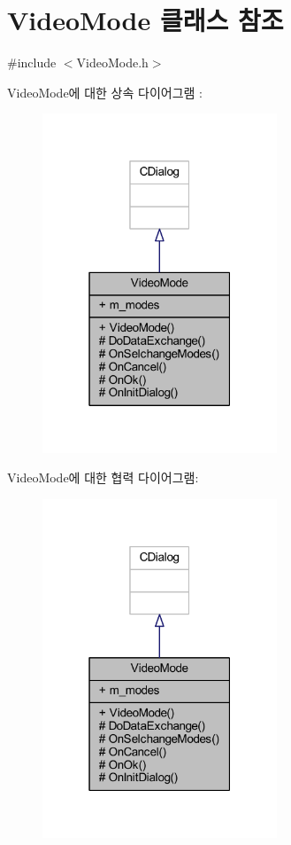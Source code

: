 \hypertarget{class_video_mode}{}\section{Video\+Mode 클래스 참조}
\label{class_video_mode}


{\ttfamily \#include $<$Video\+Mode.\+h$>$}



Video\+Mode에 대한 상속 다이어그램 \+: \nopagebreak
\begin{figure}[H]
\begin{center}
\leavevmode
\includegraphics[width=199pt]{class_video_mode__inherit__graph}
\end{center}
\end{figure}


Video\+Mode에 대한 협력 다이어그램\+:\nopagebreak
\begin{figure}[H]
\begin{center}
\leavevmode
\includegraphics[width=199pt]{class_video_mode__coll__graph}
\end{center}
\end{figure}

